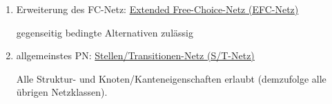 \begin{enumerate}
	\item Erweiterung des FC-Netz: \underline{Extended Free-Choice-Netz (EFC-Netz)}
	
	gegenseitig bedingte Alternativen zulässig
	
	\item allgemeinstes PN: \underline{Stellen/Transitionen-Netz (S/T-Netz)}
	
	Alle Struktur- und Knoten/Kanteneigenschaften erlaubt (demzufolge alle übrigen Netzklassen).
\end{enumerate}



